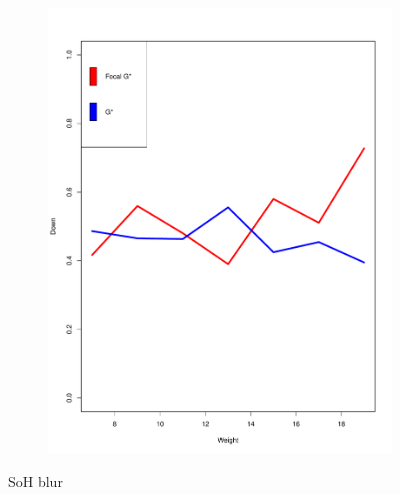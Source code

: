 \documentclass{itatnew}
\begin{document}
\begin{figure}[htp]
\begin{subfigure}{\linewidth}
    \includegraphics[width=\linewidth]{images/SoHDownBlur}
    \label{fig:DownwardBlur}
  \end{subfigure}
  \caption{SoH blur}
  \label{fig:Blur}
\end{figure}
\end{document}
